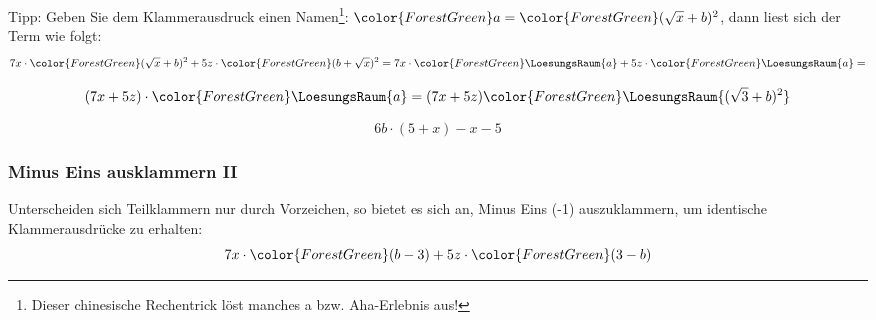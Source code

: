 Tipp: Geben Sie dem Klammerausdruck einen Namen\footnote{Dieser
chinesische Rechentrick löst manches {\color{ForestGreen}a} bzw. {\color{ForestGreen}Aha}-Erlebnis aus!}: ${\color{ForestGreen}a} = {\color{ForestGreen}(\sqrt{x}+b)^2}$, dann liest sich der
Term wie folgt:
$$7x\cdot{}{\color{ForestGreen}(\sqrt{x}+b)^2} + 5z\cdot{}{\color{ForestGreen}(b+\sqrt{x})^2} = 7x\cdot{\color{ForestGreen}\LoesungsRaum{a}}
+ 5z\cdot{\color{ForestGreen}\LoesungsRaum{a}} =$$

$$(7x+5z)\cdot{\color{ForestGreen}\LoesungsRaum{a}} = (7x+5z){\color{ForestGreen}\LoesungsRaum{(\sqrt{3}+b)^2}}$$

\begin{beispiel}{}{}
$$6b\cdot{}(5+x) - x- 5$$

\end{beispiel}






\newpage



\subsubsection{Minus Eins ausklammern II}
Unterscheiden sich Teilklammern nur durch Vorzeichen, so bietet es
sich an, Minus Eins (-1) auszuklammern, um identische Klammerausdrücke
zu erhalten:
$$7x\cdot{}{\color{ForestGreen}(b-3)} + 5z\cdot{}{\color{ForestGreen}(3-b)}$$%






